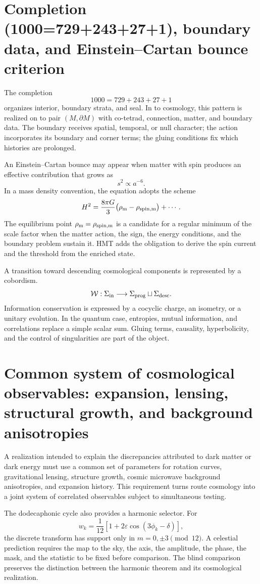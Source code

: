 \section{Completion (1000=729+243+27+1), boundary data, and Einstein–Cartan bounce criterion}

The completion
\[
 1000=729+243+27+1
\]
organizes interior, boundary strata, and seal. In to cosmology, this
pattern is realized on to pair \((M,\partial M)\) with co-tetrad, connection,
matter, and boundary data. The boundary receives spatial, temporal, or
null character; the action incorporates its boundary and corner terms; the gluing conditions
fix which histories are prolonged.

An Einstein--Cartan bounce may appear when matter with spin
produces an effective contribution that grows as
\[
 s^2\propto a^{-6}.
\]
In a mass density convention, the equation adopts the scheme
\[
 H^2=\frac{8\pi G}{3}
 \bigl(\rho_{\rm m}-\rho_{\rm spin,m}\bigr)+\cdots.
\]
The equilibrium point
\(\rho_{\rm m}=\rho_{\rm spin,m}\) is a candidate for a regular minimum of the
scale factor when the matter action, the sign, the energy conditions,
and the boundary problem sustain it. HMT adds the obligation to
derive the spin current and the threshold from the enriched state.

A transition toward descending cosmological components is represented by a cobordism.
\[
 \mathcal W:
 \Sigma_{\rm in}\longrightarrow
 \Sigma_{\rm prog}\sqcup\Sigma_{\rm desc}.
\]
Information conservation is expressed by a cocyclic charge, an
isometry, or a unitary evolution. In the quantum case, entropies, mutual
information, and correlations replace a simple scalar sum.
Gluing terms, causality, hyperbolicity, and the control of
singularities are part of the object.

\section{Common system of cosmological observables: expansion, lensing, structural growth, and background anisotropies}

A realization intended to explain the discrepancies attributed to dark
matter or dark energy must use a common set of parameters for
rotation curves, gravitational lensing, structure growth,
cosmic microwave background anisotropies, and expansion history. This requirement
turns route cosmology into a joint system of correlated observables
subject to simultaneous testing.

The dodecaphonic cycle also provides a harmonic selector. For
\[
 w_k=\frac1{12}
 \left[1+2\varepsilon\cos(3\phi_k-\delta)\right],
\]
the discrete transform has support only in
\(m=0,\pm3\pmod{12}\). A celestial prediction requires the map to the sky, the axis,
the amplitude, the phase, the mask, and the statistic to be fixed before comparison.
The blind comparison preserves the distinction between the harmonic theorem and its
cosmological realization.

